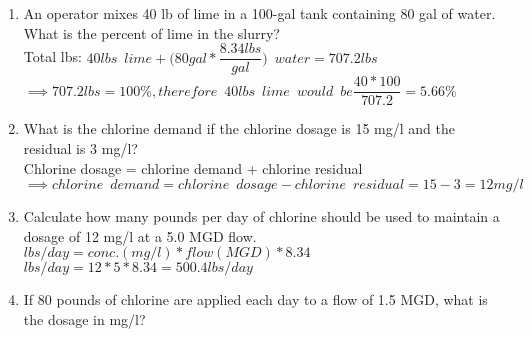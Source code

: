\documentclass{article}
\begin{document}
\begin{enumerate}
\item An operator mixes 40 lb of lime in a 100-gal tank containing 80 gal of water. What is the percent of lime in the slurry?\\
\vspace{0.25cm}
Total lbs: $40lbs \enspace lime + \Big(80 gal*\dfrac{8.34lbs}{gal}\Big) \enspace water =707.2 lbs$\\
\vspace{0.2cm}
$\implies 707.2 lbs=100\%, therefore \enspace 40 lbs \enspace lime \enspace would \enspace be \dfrac{40*100}{707.2}=\boxed{5.66\%}$
\vspace{0.25cm}
\item What is the chlorine demand if the chlorine dosage is 15 mg/l and the residual is 3 mg/l?\\
\vspace{0.2cm}
Chlorine dosage = chlorine demand + chlorine residual\\
$\implies chlorine \enspace demand = chlorine \enspace dosage - chlorine \enspace residual=15-3=\boxed{12mg/l}$\\
\vspace{0.25cm}
\item Calculate how many pounds per day of chlorine should be used to maintain a dosage of 12 mg/l at a 5.0 MGD flow.\\
\vspace{0.25cm}
$lbs/day=conc. (mg/l)*flow(MGD)*8.34$\\
\vspace{0.25cm}
$lbs/day=12*5*8.34=\boxed{500.4lbs/day}$\\
\vspace{0.25cm}
\item If 80 pounds of chlorine are applied each day to a flow of 1.5 MGD, what is the dosage in mg/l?\\
\vspace{0.25cm}


\end{enumerate}
\end{document}
